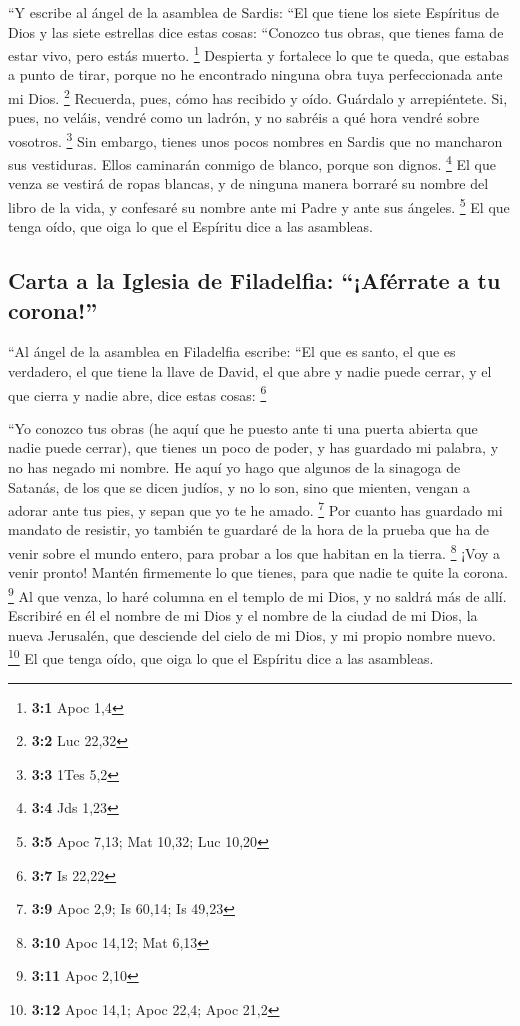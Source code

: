 \begin{paracol}{2}
 ``Y escribe al ángel de la asamblea de Sardis: ``El que
tiene los siete Espíritus de Dios y las siete estrellas dice estas
cosas: ``Conozco tus obras, que tienes fama de estar vivo, pero estás
muerto. \footnote{\textbf{3:1} Apoc 1,4}  Despierta y
fortalece lo que te queda, que estabas a punto de tirar, porque no he
encontrado ninguna obra tuya perfeccionada ante mi Dios. \footnote{\textbf{3:2}
  Luc 22,32}  Recuerda, pues, cómo has recibido y oído.
Guárdalo y arrepiéntete. Si, pues, no veláis, vendré como un ladrón, y
no sabréis a qué hora vendré sobre vosotros. \footnote{\textbf{3:3} 1Tes
  5,2}  Sin embargo, tienes unos pocos nombres en Sardis
que no mancharon sus vestiduras. Ellos caminarán conmigo de blanco,
porque son dignos. \footnote{\textbf{3:4} Jds 1,23}  El
que venza se vestirá de ropas blancas, y de ninguna manera borraré su
nombre del libro de la vida, y confesaré su nombre ante mi Padre y ante
sus ángeles. \footnote{\textbf{3:5} Apoc 7,13; Mat 10,32; Luc 10,20}
 El que tenga oído, que oiga lo que el Espíritu dice a las
asambleas.

\hypertarget{carta-a-la-iglesia-de-filadelfia-afuxe9rrate-a-tu-corona}{%
\subsection{Carta a la Iglesia de Filadelfia: ``¡Aférrate a tu
corona!''}\label{carta-a-la-iglesia-de-filadelfia-afuxe9rrate-a-tu-corona}}

 ``Al ángel de la asamblea en Filadelfia escribe: ``El que
es santo, el que es verdadero, el que tiene la llave de David, el que
abre y nadie puede cerrar, y el que cierra y nadie abre, dice estas
cosas: \footnote{\textbf{3:7} Is 22,22}

 ``Yo conozco tus obras (he aquí que he puesto ante ti una
puerta abierta que nadie puede cerrar), que tienes un poco de poder, y
has guardado mi palabra, y no has negado mi nombre.  He
aquí yo hago que algunos de la sinagoga de Satanás, de los que se dicen
judíos, y no lo son, sino que mienten, vengan a adorar ante tus pies, y
sepan que yo te he amado. \footnote{\textbf{3:9} Apoc 2,9; Is 60,14; Is
  49,23}  Por cuanto has guardado mi mandato de resistir,
yo también te guardaré de la hora de la prueba que ha de venir sobre el
mundo entero, para probar a los que habitan en la tierra. \footnote{\textbf{3:10}
  Apoc 14,12; Mat 6,13}  ¡Voy a venir pronto! Mantén
firmemente lo que tienes, para que nadie te quite la corona. \footnote{\textbf{3:11}
  Apoc 2,10}  Al que venza, lo haré columna en el templo
de mi Dios, y no saldrá más de allí. Escribiré en él el nombre de mi
Dios y el nombre de la ciudad de mi Dios, la nueva Jerusalén, que
desciende del cielo de mi Dios, y mi propio nombre nuevo. \footnote{\textbf{3:12}
  Apoc 14,1; Apoc 22,4; Apoc 21,2}  El que tenga oído,
que oiga lo que el Espíritu dice a las asambleas.


\end{paracol}
